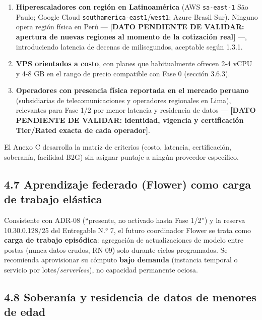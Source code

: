 \documentclass[11pt,a4paper]{article}
\providecommand{\tightlist}{%
  \setlength{\itemsep}{0pt}\setlength{\parskip}{0pt}}
\begin{document}
\begin{enumerate}
\def\labelenumi{\arabic{enumi}.}
\tightlist
\item
  \textbf{Hiperescaladores con región en Latinoamérica} (AWS \texttt{sa-east-1} São Paulo; Google Cloud \texttt{southamerica-east1}/\texttt{west1}; Azure Brasil Sur). Ninguno opera región física en Perú --- \textbf{{[}DATO PENDIENTE DE VALIDAR: apertura de nuevas regiones al momento de la cotización real{]}} ---, introduciendo latencia de decenas de milisegundos, aceptable según 1.3.1.
\item
  \textbf{VPS orientados a costo}, con planes que habitualmente ofrecen 2-4 vCPU y 4-8 GB en el rango de precio compatible con Fase 0 (sección 3.6.3).
\item
  \textbf{Operadores con presencia física reportada en el mercado peruano} (subsidiarias de telecomunicaciones y operadores regionales en Lima), relevantes para Fase 1/2 por menor latencia y residencia de datos --- \textbf{{[}DATO PENDIENTE DE VALIDAR: identidad, vigencia y certificación Tier/Rated exacta de cada operador{]}}.
\end{enumerate}

El Anexo C desarrolla la matriz de criterios (costo, latencia, certificación, soberanía, facilidad B2G) sin asignar puntaje a ningún proveedor específico.

\subsection{4.7 Aprendizaje federado (Flower) como carga de trabajo elástica}\label{aprendizaje-federado-flower-como-carga-de-trabajo-eluxe1stica}

Consistente con ADR-08 (``presente, no activado hasta Fase 1/2'') y la reserva 10.30.0.128/25 del Entregable N.° 7, el futuro coordinador Flower se trata como \textbf{carga de trabajo episódica}: agregación de actualizaciones de modelo entre postas (nunca datos crudos, RN-09) solo durante ciclos programados. Se recomienda aprovisionar su cómputo \textbf{bajo demanda} (instancia temporal o servicio por lotes/\emph{serverless}), no capacidad permanente ociosa.

\subsection{4.8 Soberanía y residencia de datos de menores de edad}\label{soberanuxeda-y-residencia-de-datos-de-menores-de-edad}
\end{document}
